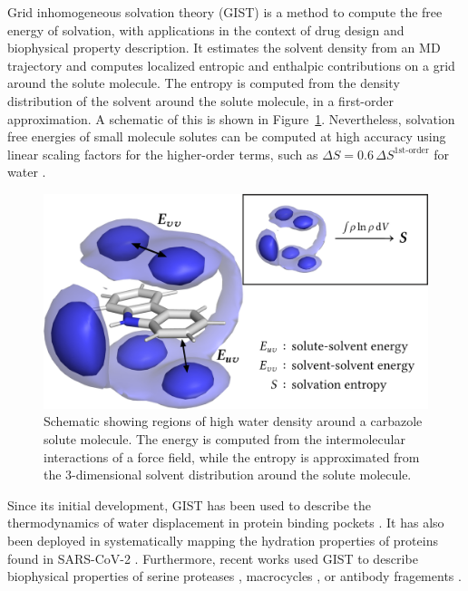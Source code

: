 \documentclass[9pt,tutorial]{livecoms}
\begin{document}
Grid inhomogeneous solvation theory (GIST) is a method to compute the free energy of solvation, with applications in the context of drug design and biophysical property description.
It estimates the solvent density from an MD trajectory and computes localized entropic and enthalpic contributions on a grid around the solute molecule.
The entropy is computed from the density distribution of the solvent around the solute molecule, in a first-order approximation. A schematic of this is shown in Figure~\ref{fig:carbazole}. Nevertheless, solvation free energies of small molecule solutes can be computed at high accuracy using linear scaling factors for the higher-order terms, such as $\Delta S = 0.6\, \Delta S^\text{1st-order}$ for water \cite{Chen2021,Waibl2022-gist-solvents}.

\begin{figure}
    \centering
    \includegraphics[width=\linewidth]{figures/carbazole-figure.png}
    \caption{Schematic showing regions of high water density around a carbazole solute molecule. The energy is computed from the intermolecular interactions of a force field, while the entropy is approximated from the 3-dimensional solvent distribution around the solute molecule.}
    \label{fig:carbazole}
\end{figure}

Since its initial development, GIST has been used to describe the thermodynamics of water displacement in protein binding pockets \cite{Nguyen2016-gist-second-order,Ramsey2016,Balius2017-gist-ligand-discovery,Hufner-Wulsdorf2020-gist-drug-design}.
It has also been deployed in systematically mapping the hydration properties of proteins found in SARS-CoV-2 \cite{Olson2020-covid-gist}.
Furthermore, recent works used GIST to describe biophysical properties of serine proteases \cite{Kraml2019-gigist}, macrocycles \cite{Kamenik2020-gist-macrocycles}, or antibody fragements \cite{Waibl2021-gist-antibodies}.
\end{document}
